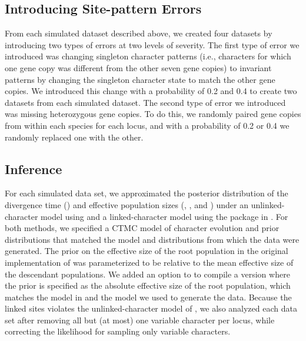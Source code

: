 \subsection{Introducing Site-pattern Errors}
From each simulated dataset described above, we created four datasets by 
introducing two types of errors at two levels of severity. The first type of 
error we introduced was changing singleton character patterns (i.e., characters 
for which one gene copy was different from the other seven gene copies) to invariant 
patterns by changing the singleton character state to match the other gene 
copies. We introduced this change with a probability of 0.2 and 0.4 to create 
two datasets from each simulated dataset. The second type of error we introduced 
was missing heterozygous gene copies. To do this, we randomly paired gene copies 
from within each species for each locus, and with a probability 
of 0.2 or 0.4 we randomly replaced one with the other.


\subsection{Inference}
For each simulated data set,
we approximated the posterior distribution of the divergence time (\divtime)
and effective population sizes
(\rootpopsize, \tippopsize[1], and \tippopsize[2])
under an
unlinked-character model using
\ecoevolity
\citep[Version 0.3.2; dev branch commit a7e9bf2;][]{Oaks2018ecoevolity}
and a linked-character model using the
\beast
\citep[Version 0.15.1;][]{ogilvieStarBEAST2BringsFaster2017} 
package in
\beastcore
\citep[Version 2.5.2;][]{bouckaertBEASTSoftwarePlatform2014}.
For both methods, we specified a CTMC model of character evolution and prior
distributions that matched the model and distributions from which the data were
generated.
The prior on the effective size of the root population in the original
implementation of \ecoevolity was parameterized to be relative to the mean
effective size of the descendant populations.
We added an option to \ecoevolity to compile a version where the prior is
specified as the absolute effective size of the root population,
which matches the model in \beast and the model we used to generate the data.
Because the linked sites violates the unlinked-character model of
\ecoevolity \citep{bryantInferringSpeciesTrees2012,Oaks2018ecoevolity},
we also analyzed each data set after removing all but (at most)
one variable character per locus, while correcting the likelihood
for sampling only variable characters.

